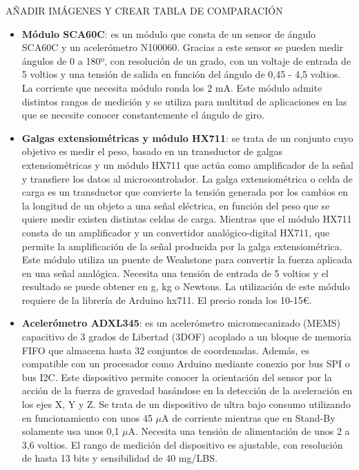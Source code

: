 AÑADIR IMÁGENES Y CREAR TABLA DE COMPARACIÓN
\begin{itemize}
    \item \textbf{Módulo SCA60C}: es un módulo que consta de un sensor de ángulo SCA60C y un acelerómetro N100060. Gracias a este sensor se pueden medir ángulos de 0 a 180º, con resolución de un grado, con un voltaje de entrada de 5 voltios y una tensión de salida en función del ángulo de 0,45 - 4,5 voltios. La corriente que necesita módulo ronda los 2 mA. Este módulo admite distintos rangos de medición y se utiliza para multitud de aplicaciones en las que se necesite conocer constantemente el ángulo de giro. 
    
    \item \textbf{Galgas extensiométricas y módulo HX711}: se trata de un conjunto cuyo objetivo es medir el peso, basado en un transductor de galgas extensiométricas y un módulo HX711 que actúa como amplificador de la señal y transfiere los datos al microcontrolador. La galga extensiométrica o celda de carga es un transductor que convierte la tensión generada por los cambios en la longitud de un objeto a una señal eléctrica, en función del peso que se quiere medir existen distintas celdas de carga. Mientras que el módulo HX711 consta de un amplificador y un convertidor analógico-digital HX711, que permite la amplificación de la señal producida por la galga extensiométrica. Este módulo utiliza un puente de Weahstone para convertir la fuerza aplicada en una señal analógica. Necesita una tensión de entrada de 5 voltios y el resultado se puede obtener en g, kg o Newtons. La utilización de este módulo requiere de la librería de Arduino hx711. El precio ronda los 10-15€.
    
    \item \textbf{Acelerómetro ADXL345}: es un acelerómetro micromecanizado (MEMS) capacitivo de 3 grados de Libertad (3DOF) acoplado a un bloque de memoria FIFO que almacena hasta 32 conjuntos de coordenadas. Además, es compatible con un procesador como Arduino mediante conexio por bus SPI o bus I2C. Este dispositivo permite conocer la orientación del sensor por la acción de la fuerza de gravedad basándose en la detección de la aceleración en los ejes X, Y y Z. Se trata de un dispositivo de ultra bajo consumo utilizando en funcionamiento con unos 45 $\mu$A de corriente mientras que en Stand-By solamente usa unos 0,1 $\mu$A. Necesita una tensión de alimentación de unos 2 a 3,6 voltios. El rango de medición del dispositivo es ajustable, con resolución de hasta 13 bits y sensibilidad de 40 mg/LBS.
    

\end{itemize}
